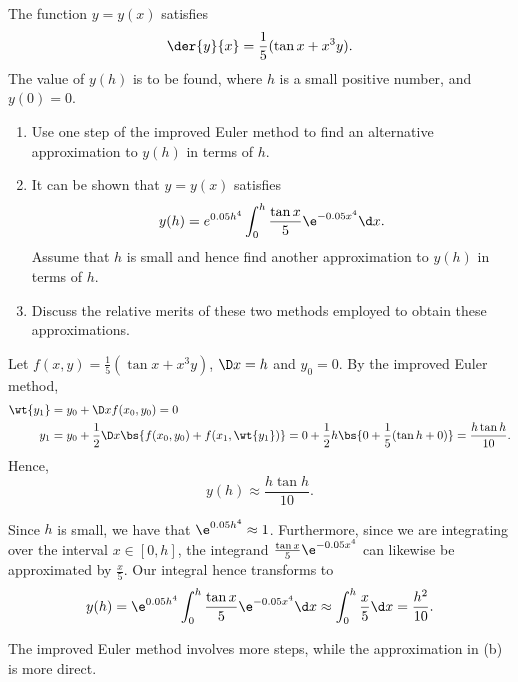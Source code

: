 \begin{problem}
    The function $y = y(x)$ satisfies \[\der{y}{x} = \frac15 (\tan x + x^3 y).\] The value of $y(h)$ is to be found, where $h$ is a small positive number, and $y(0) = 0$.
    \begin{enumerate}
        \item Use one step of the improved Euler method to find an alternative approximation to $y(h)$ in terms of $h$.
        \item It can be shown that $y = y(x)$ satisfies \[y(h) = e^{0.05h^4} \int_0^h \frac{\tan x}{5} \e^{-0.05x^4} \d x.\] Assume that $h$ is small and hence find another approximation to $y(h)$ in terms of $h$.
        \item Discuss the relative merits of these two methods employed to obtain these approximations.
    \end{enumerate}
\end{problem}
\clearpage
\begin{solution}
    \begin{ppart}
        Let $f(x, y) = \frac15 (\tan x + x^3 y)$, $\D x = h$ and $y_0 = 0$. By the improved Euler method,
        \begin{align*}
            \wt{y_1} &= y_0 + \D x f(x_0, y_0) = 0\\
            y_1 &= y_0 + \frac12 \D x \bs{f(x_0, y_0) + f(x_1, \wt{y_1})} = 0 + \frac12 h \bs{0 + \frac15(\tan h + 0)} = \frac{h \tan h}{10}.
        \end{align*}
        Hence, \[y(h) \approx \frac{h\tan h}{10}.\]
    \end{ppart}
    \begin{ppart}
        Since $h$ is small, we have that $\e^{0.05h^4} \approx 1$. Furthermore, since we are integrating over the interval $x \in [0, h]$, the integrand $\frac{\tan x}{5} \e^{-0.05x^4}$ can likewise be approximated by $\frac{x}{5}$. Our integral hence transforms to \[y(h) = \e^{0.05h^4} \int_0^h \frac{\tan x}{5} \e^{-0.05x^4} \d x \approx \int_0^h \frac{x}{5} \d x = \frac{h^2}{10}.\]
    \end{ppart}
    \begin{ppart}
        The improved Euler method involves more steps, while the approximation in (b) is more direct.
    \end{ppart}
\end{solution}